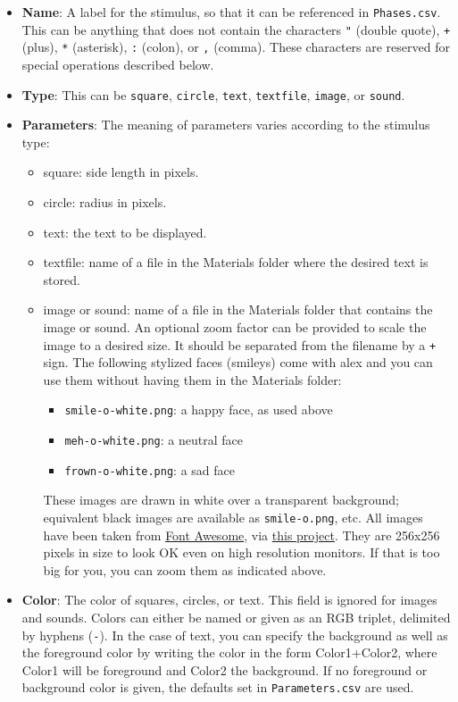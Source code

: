 \documentclass[11pt,]{article}
\begin{document}
\begin{itemize}
\item
  \textbf{Name}: A label for the stimulus, so that it can be referenced
  in \texttt{Phases.csv}. This can be anything that does not contain the
  characters \texttt{"} (double quote), \texttt{+} (plus), \texttt{*}
  (asterisk), \texttt{:} (colon), or \texttt{,} (comma). These
  characters are reserved for special operations described below.
\item
  \textbf{Type}: This can be \texttt{square}, \texttt{circle},
  \texttt{text}, \texttt{textfile}, \texttt{image}, or \texttt{sound}.
\item
  \textbf{Parameters}: The meaning of parameters varies according to the
  stimulus type:

  \begin{itemize}
  \item
    square: side length in pixels.
  \item
    circle: radius in pixels.
  \item
    text: the text to be displayed.
  \item
    textfile: name of a file in the Materials folder where the desired
    text is stored.
  \item
    image or sound: name of a file in the Materials folder that contains
    the image or sound. An optional zoom factor can be provided to scale
    the image to a desired size. It should be separated from the
    filename by a \texttt{+} sign. The following stylized faces
    (smileys) come with alex and you can use them without having them in
    the Materials folder:

    \begin{itemize}
    \item
      \texttt{smile-o-white.png}: a happy face, as used above
    \item
      \texttt{meh-o-white.png}: a neutral face
    \item
      \texttt{frown-o-white.png}: a sad face
    \end{itemize}

    These images are drawn in white over a transparent background;
    equivalent black images are available as \texttt{smile-o.png}, etc.
    All images have been taken from
    \href{http://fortawesome.github.io/Font-Awesome}{Font Awesome}, via
    \href{https://github.com/encharm/Font-Awesome-SVG-PNG}{this
    project}. They are 256x256 pixels in size to look OK even on high
    resolution monitors. If that is too big for you, you can zoom them
    as indicated above.
  \end{itemize}
\item
  \textbf{Color}: The color of squares, circles, or text. This field is
  ignored for images and sounds. Colors can either be named or given as
  an RGB triplet, delimited by hyphens (\texttt{-}). In the case of
  text, you can specify the background as well as the foreground color
  by writing the color in the form Color1+Color2, where Color1 will be
  foreground and Color2 the background. If no foreground or background
  color is given, the defaults set in \texttt{Parameters.csv} are used.


\end{itemize}
\end{document}
